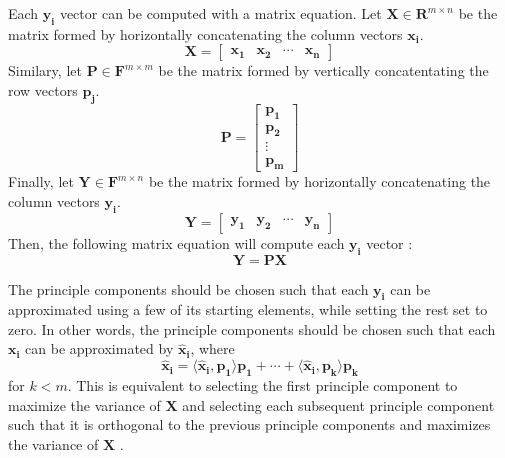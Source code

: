 \documentclass[conference]{IEEEtran}
\begin{document}
    	Each $\mathbf{y_i}$ vector can be computed with a matrix equation. Let $\mathbf{X} \in \mathbf{R}^{m \times n}$ be the matrix formed by horizontally concatenating the column vectors $\mathbf{x_i}$.
    \begin{equation}
    		\mathbf{X} = \begin{bmatrix}
    			\mathbf{x_1} & \mathbf{x_2} & \cdots & \mathbf{x_n}
    		\end{bmatrix}
    	\end{equation}
    	Similary, let $\mathbf{P} \in \mathbf{F}^{m \times m}$ be the matrix formed by vertically concatentating the row vectors $\mathbf{p_j}$.
	\begin{equation}
    		\mathbf{P} = \begin{bmatrix}
    			\mathbf{p_1} \\ \mathbf{p_2} \\ \vdots \\ \mathbf{p_m}
    		\end{bmatrix}
    	\end{equation}
    	Finally, let $\mathbf{Y} \in \mathbf{F}^{m \times n}$ be the matrix formed by horizontally concatenating the column vectors $\mathbf{y_i}$.
    \begin{equation}
    		\mathbf{Y} = \begin{bmatrix}
    			\mathbf{y_1} & \mathbf{y_2} & \cdots & \mathbf{y_n}
    		\end{bmatrix}
    	\end{equation}
    	Then, the following matrix equation will compute each $\mathbf{y_i}$ vector \cite{shlens_2014_tutorial}:
    	\begin{equation}
    		\mathbf{Y} = \mathbf{P}\mathbf{X}
    	\end{equation}

    	The principle components should be chosen such that each $\mathbf{y_i}$ can be approximated using a few of its starting elements, while setting the rest set to zero. In other words, the principle components should be chosen such that each $\mathbf{x_i}$ can be approximated by $\mathbf{\hat{x}_i}$, where 
    	\begin{equation}
 		\mathbf{\hat{x}_i} = \langle \mathbf{\hat{x}_i}, \mathbf{p_1} \rangle \mathbf{p_1} + \cdots + \langle \mathbf{\hat{x}_i}, \mathbf{p_k} \rangle \mathbf{p_k}
 	\end{equation}   	
    	for $k < m$. This is equivalent to selecting the first principle component to maximize the variance of $\mathbf{X}$ and selecting each subsequent principle component such that it is orthogonal to the previous principle components and maximizes the variance of $\mathbf{X}$ \cite{shlens_2014_tutorial}.
    	
\end{document}
